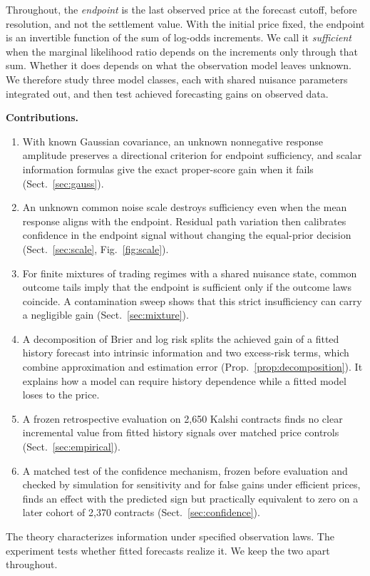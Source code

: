 \documentclass[runningheads]{llncs}
\begin{document}
Throughout, the \emph{endpoint} is the last observed price at the forecast cutoff, before resolution, and not the settlement value. With the initial price fixed, the endpoint is an invertible function of the sum of log-odds increments. We call it \emph{sufficient} when the marginal likelihood ratio depends on the increments only through that sum. Whether it does depends on what the observation model leaves unknown. We therefore study three model classes, each with shared nuisance parameters integrated out, and then test achieved forecasting gains on observed data.

\medskip\noindent\textbf{Contributions.}
\begin{enumerate}
\item With known Gaussian covariance, an unknown nonnegative response amplitude preserves a directional criterion for endpoint sufficiency, and scalar information formulas give the exact proper-score gain when it fails (Sect.~\ref{sec:gauss}).
\item An unknown common noise scale destroys sufficiency even when the mean response aligns with the endpoint. Residual path variation then calibrates confidence in the endpoint signal without changing the equal-prior decision (Sect.~\ref{sec:scale}, Fig.~\ref{fig:scale}).
\item For finite mixtures of trading regimes with a shared nuisance state, common outcome tails imply that the endpoint is sufficient only if the outcome laws coincide. A contamination sweep shows that this strict insufficiency can carry a negligible gain (Sect.~\ref{sec:mixture}).
\item A decomposition of Brier and log risk splits the achieved gain of a fitted history forecast into intrinsic information and two excess-risk terms, which combine approximation and estimation error (Prop.~\ref{prop:decomposition}). It explains how a model can require history dependence while a fitted model loses to the price.
\item A frozen retrospective evaluation on 2,650 Kalshi contracts finds no clear incremental value from fitted history signals over matched price controls (Sect.~\ref{sec:empirical}).
\item A matched test of the confidence mechanism, frozen before evaluation and checked by simulation for sensitivity and for false gains under efficient prices, finds an effect with the predicted sign but practically equivalent to zero on a later cohort of 2,370 contracts (Sect.~\ref{sec:confidence}).
\end{enumerate}
The theory characterizes information under specified observation laws. The experiment tests whether fitted forecasts realize it. We keep the two apart throughout.
\end{document}

